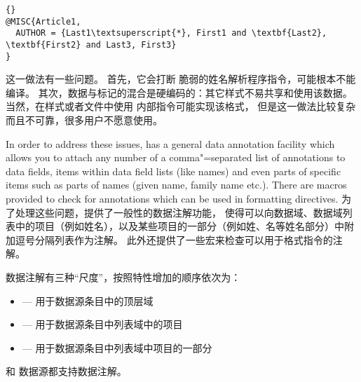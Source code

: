 \begin{lstlisting}[style=bibtex]{}
@MISC{Article1,
  AUTHOR = {Last1\textsuperscript{*}, First1 and \textbf{Last2}, \textbf{First2} and Last3, First3}
}
\end{lstlisting}
%
这一做法有一些问题。
首先，它会打断 \BibTeX 脆弱的姓名解析程序指令，可能根本不能编译。
其次，数据与标记的混合是硬编码的：其它样式不易共享和使用该数据。
当然，在样式或者文件中使用 \biblatex 内部指令可能实现该格式，
但是这一做法比较复杂而且不可靠，很多用户不愿意使用。


 In order to address these issues, \biblatex has a general data annotation facility which allows you to attach any number of a comma"=separated list of annotations to data fields, items within data field lists (like names) and even parts of specific items such as parts of names (given name, family name etc.). There are macros provided to check for annotations which can be used in formatting directives.
为了处理这些问题，\biblatex 提供了一般性的数据注解功能，
使得可以向数据域、数据域列表中的项目（例如姓名），以及某些项目的一部分（例如姓、名等姓名部分）中附加逗号分隔列表作为注解。
此外还提供了一些宏来检查可以用于格式指令的注解。

数据注解有三种“尺度”，按照特性增加的顺序依次为：
\begin{itemize}
\item {}---%
用于数据源条目中的顶层域
\item {}---%
用于数据源条目中列表域中的项目
\item {}---%
用于数据源条目中列表域中项目的一部分
\end{itemize}
%
\BibTeX 和 \biblatexml 数据源都支持数据注解。



